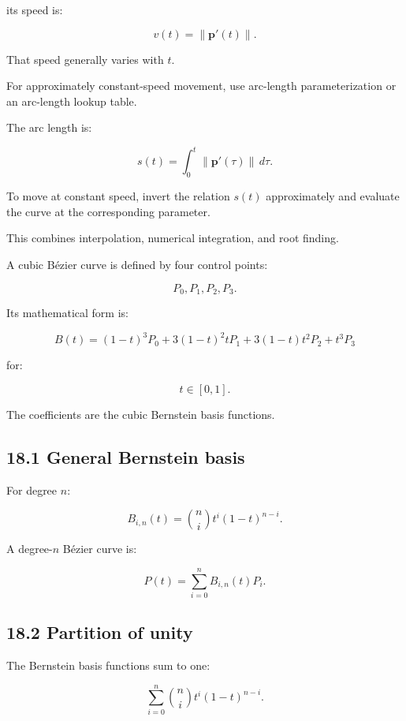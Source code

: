 its speed is:

\[ \boxed{ v(t)=\|\mathbf p'(t)\| }. \]

That speed generally varies with \(t\).

For approximately constant-speed movement, use arc-length parameterization or an arc-length lookup table.

The arc length is:

\[ \boxed{ s(t)=\int_0^t\|\mathbf p'(\tau)\|\,d\tau }. \]

To move at constant speed, invert the relation \(s(t)\) approximately and evaluate the curve at the corresponding parameter.

This combines interpolation, numerical integration, and root finding.

A cubic Bézier curve is defined by four control points:

\[ P_0,P_1,P_2,P_3. \]

Its mathematical form is:

\[ \boxed{ B(t)= (1-t)^3P_0+ 3(1-t)^2tP_1+ 3(1-t)t^2P_2+ t^3P_3 } \]

for:

\[ t\in[0,1]. \]

The coefficients are the cubic Bernstein basis functions.

\subsection{18.1 General Bernstein basis}\label{02-foundations-ii-ch028-general-bernstein-basis}

\hypertarget{02-foundations-ii-ch028-general-bernstein-basis}{}

For degree \(n\):

\[ \boxed{ B_{i,n}(t)= \binom ni t^i(1-t)^{n-i} }. \]

A degree-\(n\) Bézier curve is:

\[ \boxed{ P(t)=\sum_{i=0}^{n}B_{i,n}(t)P_i }. \]

\subsection{18.2 Partition of unity}\label{02-foundations-ii-ch028-partition-of-unity}

\hypertarget{02-foundations-ii-ch028-partition-of-unity}{}

The Bernstein basis functions sum to one:

\[ \sum_{i=0}^{n} \binom ni t^i(1-t)^{n-i}. \]

